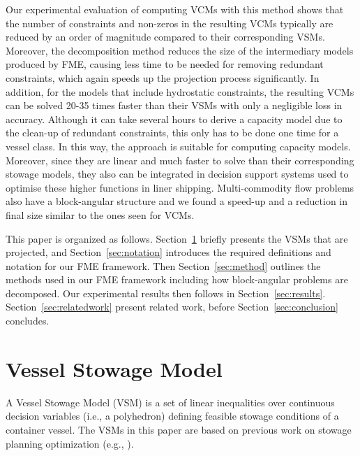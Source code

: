 \documentclass{llncs}
\begin{document}
Our experimental evaluation of computing VCMs with this method shows that the number of constraints and non-zeros in the resulting VCMs typically are reduced by an order of magnitude compared to their corresponding VSMs. Moreover, the decomposition method reduces the size of the intermediary models produced by FME, causing less time to be needed for removing redundant constraints, which again speeds up the projection process significantly. In addition, for the models that include hydrostatic constraints, the resulting VCMs can be solved 20-35 times faster than their VSMs with only a negligible loss in accuracy. Although it can take several hours to derive a capacity model due to the clean-up of redundant constraints, this only has to be done one time for a vessel class. In this way, the approach is suitable for computing capacity models. Moreover, since they are linear and much faster to solve than their corresponding stowage models, they also can be integrated in decision support systems used to optimise these higher functions in liner shipping. Multi-commodity flow problems also have a block-angular structure and we found a speed-up and a reduction in final size similar to the ones seen for VCMs.

This paper is organized as follows. Section~\ref{sec:model} briefly presents the VSMs that are projected, and Section~\ref{sec:notation} introduces the required definitions and notation for our FME framework. Then Section~\ref{sec:method} outlines the methods used in our FME framework including how block-angular problems are decomposed. Our experimental results then follows in Section~\ref{sec:results}. Section~\ref{sec:relatedwork} present related work, before Section~\ref{sec:conclusion} concludes.


\section{Vessel Stowage Model}\label{sec:model}
A Vessel Stowage Model (VSM) is a set of linear inequalities over continuous decision variables (i.e., a polyhedron) defining feasible stowage conditions of a container vessel. The VSMs in this paper are based on previous work on stowage planning optimization (e.g., \cite{roach00,kimkang02,ambrosino04,pacino11}). 
\end{document}
